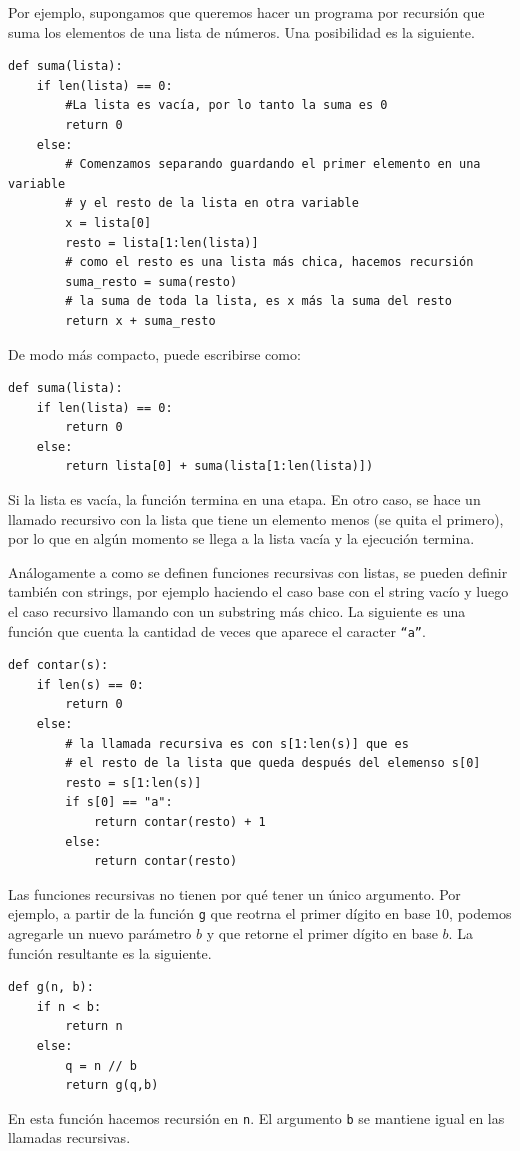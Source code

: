\documentclass[a4paper, 12pt]{report}
\theoremstyle{definition}
\begin{document}
Por ejemplo, supongamos que queremos hacer un programa por recursión que suma los elementos de una lista de números. Una posibilidad es la siguiente.
\begin{verbatim}
def suma(lista):
    if len(lista) == 0:
        #La lista es vacía, por lo tanto la suma es 0
        return 0
    else:
        # Comenzamos separando guardando el primer elemento en una variable
        # y el resto de la lista en otra variable
        x = lista[0]
        resto = lista[1:len(lista)]
        # como el resto es una lista más chica, hacemos recursión
        suma_resto = suma(resto)
        # la suma de toda la lista, es x más la suma del resto
        return x + suma_resto
\end{verbatim}
De modo más compacto, puede escribirse como:
\begin{verbatim}
def suma(lista):
    if len(lista) == 0:
        return 0
    else:
        return lista[0] + suma(lista[1:len(lista)])
\end{verbatim}
Si la lista es vacía, la función termina en una etapa. En otro caso, se hace un llamado recursivo con la lista que tiene un elemento menos (se quita el primero), por lo que en algún momento se llega a la lista vacía y la ejecución termina.

Análogamente a como se definen funciones recursivas con listas, se pueden definir también con strings, por ejemplo haciendo el caso base con el string vacío y luego el caso recursivo llamando con un substring más chico. La siguiente es una función que cuenta la cantidad de veces que aparece el caracter {\tt``a''}.
\begin{verbatim}
def contar(s):
    if len(s) == 0:
        return 0
    else:
        # la llamada recursiva es con s[1:len(s)] que es
        # el resto de la lista que queda después del elemenso s[0]
        resto = s[1:len(s)]
        if s[0] == "a":
            return contar(resto) + 1
        else:
            return contar(resto)
\end{verbatim}

Las funciones recursivas no tienen por qué tener un único argumento. Por ejemplo, a partir de la función {\tt g} que reotrna el primer dígito en base $10$, podemos agregarle un nuevo parámetro $b$ y que retorne el primer dígito en base $b$. La función resultante es la siguiente.
\begin{verbatim}
def g(n, b):
    if n < b:
        return n
    else:
        q = n // b
        return g(q,b)
\end{verbatim}
En esta función hacemos recursión en {\tt n}. El argumento {\tt b} se mantiene igual en las llamadas recursivas.
\end{document}
